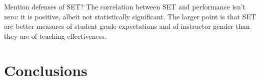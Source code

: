 \documentclass[12pt]{article}
\begin{document}
Mention defenses of SET?  The correlation between SET and performance isn't zero:
it is positive, albeit not statistically significant.
The larger point is that SET are better measures of student grade expectations and
of instructor gender than they are of teaching effectiveness.

\section{Conclusions}
\end{document}
